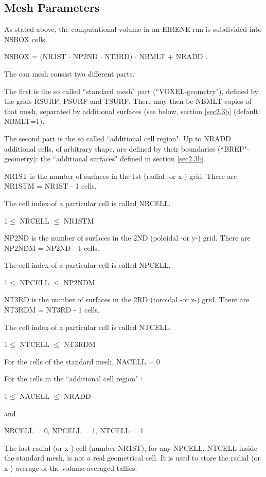 \subsection{Mesh Parameters} \label{sec2.2.1}
As stated above,
the computational volume in an EIRENE run is subdivided into NSBOX cells,

NSBOX = (NR1ST $\cdot$ NP2ND $\cdot$ NT3RD) $\cdot$ NBMLT + NRADD .

The can mesh consist two different parts.

The first is the so called ``standard mesh" part (``VOXEL-geometry"), defined
by the grids RSURF, PSURF and TSURF. There may then be NBMLT copies of that
mesh, separated by additional surfaces (see below, section \ref{sec2.3b}
(default: NBMLT=1).

The second part is the so called ``additional cell region". Up to
NRADD additional cells, of arbitrary shape, are defined by their
boundaries (``BREP"-geometry): the ``additional surfaces" defined in section
\ref{sec2.3b}.

\medskip

NR1ST is the number of surfaces in the 1st (radial -or x-) grid.
There are NR1STM = NR1ST - 1 cells.

The cell index of a particular cell is called NRCELL.

1$\le$ NRCELL $\le$ NR1STM

NP2ND is the number of surfaces in the 2ND (poloidal -or y-) grid.
There are NP2NDM = NP2ND - 1 cells.

The cell index of a particular cell is called NPCELL.

1$\le$ NPCELL $\le$ NP2NDM

NT3RD is the number of surfaces in the 2RD (toroidal -or z-) grid.
There are NT3RDM = NT3RD - 1 cells.

The cell index of a particular cell is called NTCELL.

1$\le$ NTCELL $\le$ NT3RDM

For the cells of the standard mesh, NACELL = 0

For the cells in the ``additional cell region" :

1$\le$ NACELL $\le$ NRADD

and

NRCELL = 0, NPCELL = 1, NTCELL = 1

\medskip

The last radial (or x-) cell (number NR1ST), for any NPCELL, NTCELL
inside the standard mesh,
is not a real geometrical cell. It is used to store
the radial (or x-) average of the volume averaged tallies.

